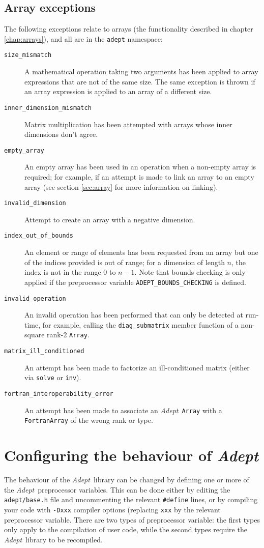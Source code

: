 \documentclass[a4,oneside]{book}
\def\codesize{\small}
\def\Adept{\emph{Adept}}
\def\code#1{{\codesize\texttt{#1}}}
\def\citem#1{\item[{\codesize\texttt{#1}}]}
\begin{document}
\subsection{Array exceptions}
\label{sec:array_exceptions}
The following exceptions relate to arrays (the functionality described
in chapter \ref{chap:arrays}), and all are in the \code{adept}
namespace:
\begin{description}
\citem{size\_mismatch} A mathematical operation taking two arguments
has been applied to array expressions that are not of the same
size. The same exception is thrown if an array expression is applied
to an array of a different size.
\citem{inner\_dimension\_mismatch} Matrix multiplication has been
attempted with arrays whose inner dimensions don't agree.
\citem{empty\_array} An empty array has been used in an operation when
a non-empty array is required; for example, if an attempt is made to
link an array to an empty array (see section \ref{sec:array} for more
information on linking).
\citem{invalid\_dimension} Attempt to create an array with a negative
dimension.
\citem{index\_out\_of\_bounds} An element or range of elements has
been requested from an array but one of the indices provided is out of
range; for a dimension of length $n$, the index is not in the range
$0$ to $n-1$. Note that bounds checking is only applied if the
preprocessor variable \code{ADEPT\_BOUNDS\_CHECKING} is defined.
\citem{invalid\_operation} An invalid operation has been performed
that can only be detected at run-time, for example, calling the
\code{diag\_submatrix} member function of a non-square rank-2
\code{Array}.
\citem{matrix\_ill\_conditioned} An attempt has been made to factorize
an ill-conditioned matrix (either via \code{solve} or \code{inv}).
\citem{fortran\_interoperability\_error} An attempt has been made to
associate an \Adept\ \code{Array} with a \code{FortranArray} of the
wrong rank or type.
\end{description}

\section{Configuring the behaviour of \Adept}
\label{sec:configuring}
The behaviour of the \Adept\ library can be changed by defining one or
more of the \Adept\ preprocessor variables. This can be done either by
editing the \code{adept/base.h} file and uncommenting the relevant
\code{\#define} lines, or by compiling your code with \code{-Dxxx}
compiler options (replacing \code{xxx} by the relevant preprocessor
variable. There are two types of preprocessor variable: the first
types only apply to the compilation of user code, while the second
types require the \Adept\ library to be recompiled.
\end{document}
